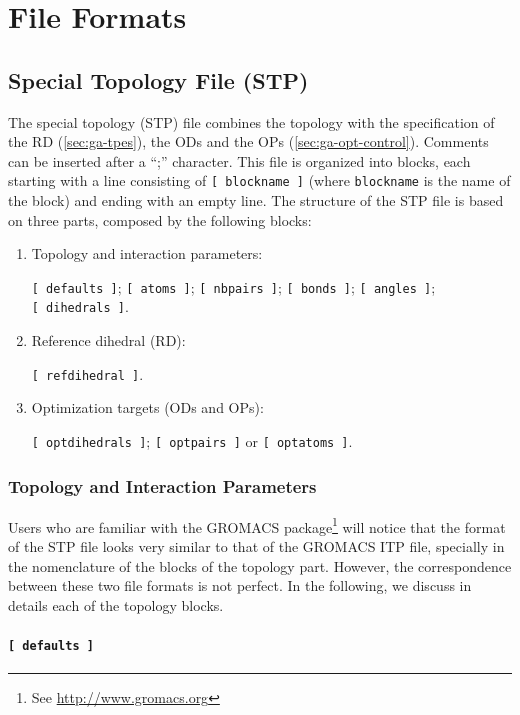\documentclass[10pt,a4paper,openany]{memoir}
\numberwithin{equation}{section}
\begin{document}
\section{File Formats}
\label{sec:file-formats-file-formats}

\subsection{Special Topology File (STP)}
\label{sec:file-formats-STP}

The special topology (STP) file combines the topology with the
specification of the RD (\autoref{sec:ga-tpes}), the ODs and the OPs
(\autoref{sec:ga-opt-control}). Comments can be inserted after a ``;''
character.  This file is organized into blocks, each starting with a
line consisting of \texttt{[~blockname~]} (where \texttt{blockname} is
the name of the block) and ending with an empty line.  The structure
of the STP file is based on three parts, composed by the following
blocks:
\begin{enumerate}
\item Topology and interaction parameters:\par \texttt{[~defaults~]}; \texttt{[~atoms~]}; \texttt{[~nbpairs~]}; \texttt{[~bonds~]}; \texttt{[~angles~]}; \texttt{[~dihedrals~]}.
\item Reference dihedral (RD):\par\texttt{[~refdihedral~]}.
\item Optimization targets (ODs and OPs):\par\texttt{[~optdihedrals~]}; \texttt{[~optpairs~]} or \texttt{[~optatoms~]}.
\end{enumerate}

\subsubsection{Topology and Interaction Parameters}
\label{sec:stp-topology}

Users who are familiar with the GROMACS
package\footnote{See \url{http://www.gromacs.org}} will notice that the
format of the STP file looks very similar to that of the GROMACS ITP
file, specially in the nomenclature of the blocks of the topology
part. However, the correspondence between these two file formats is
not perfect. In the following, we discuss in details each of the
topology blocks.

\paragraph{\texttt{[~defaults~]}}
\end{document}
